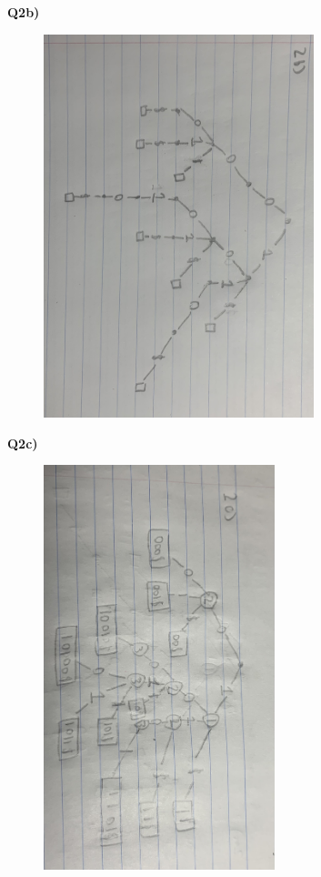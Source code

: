 \documentclass[12pt]{article}
\begin{document}
\begin{adjustwidth}{0em}{0pt}
\textbf{Q2b)}
\begin{figure}[tbhp]
	\begin{center}
		\includegraphics[width=0.7\textwidth, angle=90]{2b.jpg}
	\end{center}
\end{figure}
\end{adjustwidth} 
\newpage
\begin{adjustwidth}{0em}{0pt}
\textbf{Q2c)} 
\begin{figure}[tbhp]
	\begin{center}
		\includegraphics[width=0.6\textwidth, angle=90]{2c.jpg}
	\end{center}
\end{figure}
\end{adjustwidth} 
\end{document}
